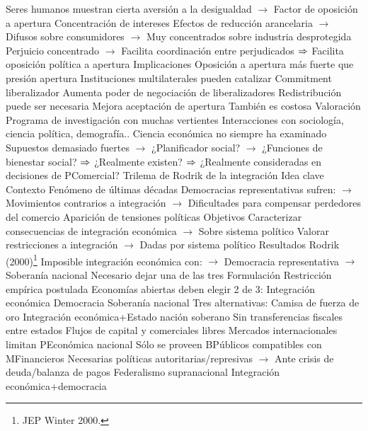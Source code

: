 \documentclass{nuevotema}
\begin{document}
\begin{esquemal}
				\4 Seres humanos muestran cierta aversión a la desigualdad
				\4[] $\to$ Factor de oposición a apertura
			\3 Concentración de intereses
				\4 Efectos de reducción arancelaria
				\4[] $\to$ Difusos sobre consumidores
				\4[] $\to$ Muy concentrados sobre industria desprotegida
				\4 Perjuicio concentrado
				\4[] $\to$ Facilita coordinación entre perjudicados
				\4[] $\Rightarrow$ Facilita oposición política a apertura
			\3 Implicaciones
				\4 Oposición a apertura más fuerte que presión apertura
				\4 Instituciones multilaterales pueden catalizar
				\4[] Commitment liberalizador
				\4[] Aumenta poder de negociación de liberalizadores
				\4 Redistribución puede ser necesaria
				\4[] Mejora aceptación de apertura
				\4[] También es costosa
			\3 Valoración
				\4 Programa de investigación con muchas vertientes
				\4 Interacciones con sociología, ciencia política, demografía..
				\4 Ciencia económica no siempre ha examinado
				\4[] Supuestos demasiado fuertes
				\4[] $\to$ ¿Planificador social?
				\4[] $\to$ ¿Funciones de bienestar social?
				\4[] $\Rightarrow$ ¿Realmente existen?
				\4[] $\Rightarrow$ ¿Realmente consideradas en decisiones de PComercial?
		\2 Trilema de Rodrik de la integración
			\3 Idea clave
				\4 Contexto
				\4[] Fenómeno de últimas décadas
				\4[] Democracias representativas sufren:
				\4[] $\to$ Movimientos contrarios a integración
				\4[] $\to$ Dificultades para compensar perdedores del comercio
				\4[] Aparición de tensiones políticas
				\4 Objetivos
				\4[] Caracterizar consecuencias de integración económica
				\4[] $\to$ Sobre sistema político
				\4[] Valorar restricciones a integración
				\4[] $\to$ Dadas por sistema político
				\4 Resultados
				\4[] Rodrik (2000)\footnote{JEP Winter 2000.}
				\4[] Imposible integración económica con:
				\4[] $\to$ Democracia representativa
				\4[] $\to$ Soberanía nacional
				\4[] Necesario dejar una de las tres
			\3 Formulación
				\4 Restricción empírica postulada
				\4 Economías abiertas deben elegir 2 de 3:
				\4[I] Integración económica
				\4[II] Democracia
				\4[III] Soberanía nacional
				\4 Tres alternativas:
				\4[A] Camisa de fuerza de oro
				\4[] Integración económica+Estado nación soberano
				\4[] Sin transferencias fiscales entre estados
				\4[] Flujos de capital y comerciales libres
				\4[] Mercados internacionales limitan PEconómica nacional
				\4[] Sólo se proveen BPúblicos compatibles con MFinancieros
				\4[] Necesarias políticas autoritarias/represivas
				\4[] $\to$ Ante crisis de deuda/balanza de pagos
				\4[B] Federalismo supranacional
				\4[] Integración económica+democracia

\end{esquemal}
\end{document}
